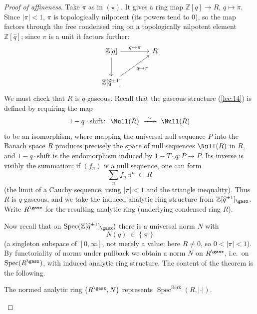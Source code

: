 \begin{proof}[Proof of affineness]
Take $\pi$ as in $(\star)$. It gives a ring map $\mathbb Z[q]\to R$,
$q\mapsto\pi$. Since $\lvert\pi\rvert<1$, $\pi$ is topologically nilpotent (its
powers tend to $0$), so the map factors through the free condensed ring on a
topologically nilpotent element $\mathbb Z[\widehat q]$; since $\pi$ is a unit it
factors further:
\begin{equation*}
\begin{tikzcd}[column sep=large, row sep=large]
\mathbb Z[q] \arrow[r, "q\mapsto\pi"] \arrow[d] & R \\
\mathbb Z[\widehat q^{\pm1}] \arrow[ur, "q\mapsto\pi"'] &
\end{tikzcd}
\end{equation*}
We must check that $R$ is $q$-gaseous. Recall that the gaseous structure
(\cref{lec:14}) is defined by requiring the map
\begin{equation*}
1-q\cdot\mathrm{shift}\colon\ \Null(R)\ \xrightarrow{\ \sim\ }\ \Null(R)
\end{equation*}
to be an isomorphism, where mapping the universal null sequence $P$ into the
Banach space $R$ produces precisely the space of null sequences $\Null(R)$ in
$R$, and $1-q\cdot\mathrm{shift}$ is the endomorphism induced by
$1-T\cdot q\colon P\to P$. Its inverse is visibly the summation: if $(f_n)$ is a
null sequence, one can form
\begin{equation*}
\sum_n f_n\,\pi^n\ \in\ R
\end{equation*}
(the limit of a Cauchy sequence, using $\lvert\pi\rvert<1$ and the triangle
inequality). Thus $R$ is $q$-gaseous, and we take the induced analytic ring
structure from $\mathbb Z[\widehat q^{\pm1}]_\gasx$. Write $R^\gasx$ for the
resulting analytic ring (underlying condensed ring $R$).

Now recall that on $\operatorname{Spec}(\mathbb Z[\widehat q^{\pm1}]_\gasx)$ there
is a universal norm $N$ with
\begin{equation*}
N(q)\ \in\ \{\lvert\pi\rvert\}
\end{equation*}
(a singleton subspace of $[0,\infty]$, not merely a value; here $R\ne0$, so
$0<\lvert\pi\rvert<1$). By functoriality of norms under pullback we obtain a norm
$N$ on $R^\gasx$, i.e.\ on
$\operatorname{Spec}(R^\gasx)$, with induced analytic ring structure. The
content of the theorem is the following.

\begin{claim}
\label{claim:23:represents}
The normed analytic ring $\bigl(R^\gasx,N\bigr)$ represents
$\operatorname{Spec}^{\mathrm{Berk}}(R,\lvert\cdot\rvert)$.
\end{claim}


\end{proof}
